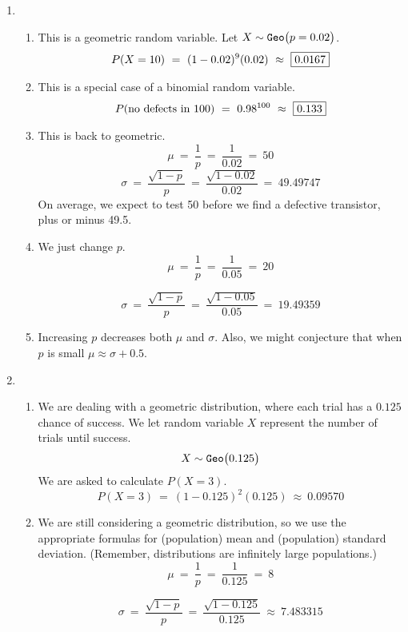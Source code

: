 \documentclass[12pt,letterpaper]{article}
\begin{document}
\begin{enumerate}
\item \begin{enumerate}
\item This is a geometric random variable. Let $X\sim \texttt{Geo}\big(p=0.02\big)$.
$$P(X=10) ~=~ (1-0.02)^9(0.02) ~\approx~ \fbox{0.0167}$$
\item This is a special case of a binomial random variable.
$$P(\text{no defects in 100}) ~=~ 0.98^{100} ~\approx~ \fbox{0.133} $$
\item This is back to geometric.
$$\mu ~=~ \frac{1}{p} ~=~ \frac{1}{0.02} ~=~ 50$$
$$
\sigma ~=~ \frac{\sqrt{1-p}}{p} ~=~ \frac{\sqrt{1-0.02}}{0.02}~=~ 49.49747$$
On average, we expect to test 50 before we find a defective transistor, plus or minus 49.5.
\item We just change $p$.
$$\mu ~=~ \frac{1}{p} ~=~ \frac{1}{0.05} ~=~ 20$$

$$
\sigma ~=~ \frac{\sqrt{1-p}}{p} ~=~ \frac{\sqrt{1-0.05}}{0.05}~=~ 19.49359$$
\item Increasing $p$ decreases both $\mu$ and $\sigma$. Also, we might conjecture that when $p$ is small $\mu \approx \sigma + 0.5$. 
\end{enumerate}

\item \begin{enumerate}
\item We are dealing with a geometric distribution, where each trial has a $0.125$ chance of success. We let random variable $X$ represent the number of trials until success. 
$$X \sim \texttt{Geo}\big(0.125\big) $$
We are asked to calculate $P(X=3)$.
$$P(X=3)~=~(1-0.125)^2(0.125) ~\approx~ 0.09570 $$
\item We are still considering a geometric distribution, so we use the appropriate formulas for (population) mean and (population) standard deviation. (Remember, distributions are infinitely large populations.)
$$\mu ~=~\frac{1}{p} ~=~ \frac{1}{0.125} ~=~ 8  $$ 

$$\sigma ~=~ \frac{\sqrt{1-p}}{p} ~=~ \frac{\sqrt{1-0.125}}{0.125}~\approx~ 7.483315$$
\end{enumerate}


\end{enumerate}
\end{document}
